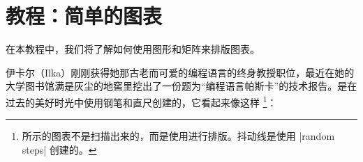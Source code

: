 %
%
%


\section{教程：简单的图表}


在本教程中，我们将了解如何使用图形和矩阵来排版图表。


伊卡尔（Ilka）刚刚获得她那古老而可爱的编程语言的终身教授职位，最近在她的大学图书馆满是灰尘的地窖里挖出了一份题为``编程语言帕斯卡''的技术报告。是在过去的美好时光中使用钢笔和直尺创建的，它看起来像这样 \footnote{所示的图表不是扫描出来的，而是使用\tikzname 进行排版。抖动线是使用 |random steps| 创建的。}：

